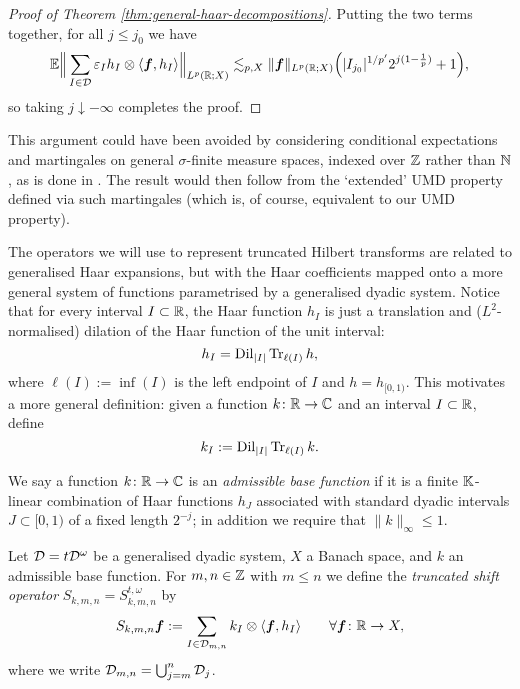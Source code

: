 \begin{proof}[Proof of Theorem \ref{thm:general-haar-decompositions}]
  Putting the two terms together, for all $j \leq j_{0}$ we have
  \begin{equation*}
    \mathbb{E} \Big\| \sum_{I \in \mathcal{D}} \varepsilon_{I} h_{I} \otimes \langle \bm{f}, h_{I} \rangle \Big\|_{L^p(\mathbb{R};X)}
    \lesssim_{p,X}  \|\bm{f}\|_{L^p(\mathbb{R};X)} \Big(|I_{j_{0}}|^{1/p'}  2^{j(1 - \frac{1}{p})} + 1\Big),
  \end{equation*}
  so taking $j \downarrow -\infty$ completes the proof.
\end{proof}

\begin{rmk}
  This argument could have been avoided by considering conditional expectations and martingales on general $\sigma$-finite measure spaces, indexed over $\mathbb{Z}$ rather than $\mathbb{N}$, as is done in \cite{HNVW16}.
  The result would then follow from the `extended' UMD property defined via such martingales (which is, of course, equivalent to our UMD property).
\end{rmk}

The operators we will use to represent truncated Hilbert transforms are related to generalised Haar expansions, but with the Haar coefficients mapped onto a more general system of functions parametrised by a generalised dyadic system.
Notice that for every interval $I \subset \mathbb{R}$, the Haar function $h_{I}$ is just a translation and ($L^2$-normalised) dilation of the Haar function of the unit interval:
\begin{equation*}
  h_{I} = \operatorname{Dil}_{|I|} \operatorname{Tr}_{\ell(I)} h,
\end{equation*}
where $\ell(I) := \inf(I)$ is the left endpoint of $I$ and $h = h_{[0,1)}$.
This motivates a more general definition: given a function $k \colon \mathbb{R} \rightarrow \mathbb{C}$ and an interval $I \subset \mathbb{R}$, define
\begin{equation*}
  k_{I} := \operatorname{Dil}_{|I|} \operatorname{Tr}_{\ell(I)} k.
\end{equation*}

\begin{defn}
  We say a function $k \colon \mathbb{R} \rightarrow \mathbb{C}$ is an \emph{admissible base function} if it is a finite $\mathbb{K}$-linear combination of Haar functions $h_{J}$ associated with standard dyadic intervals $J \subset [0,1)$ of a fixed length $2^{-j}$; in addition we require that $\|k\|_{\infty} \leq 1$.
\end{defn}

\begin{defn}
  Let $\mathcal{D} = t\mathcal{D}^{\omega}$ be a generalised dyadic system, $X$ a Banach space, and $k$ an admissible base function.
  For $m,n \in \mathbb{Z}$ with $m \leq n$ we define the \emph{truncated shift operator} $S_{k,m,n} = S_{k,m,n}^{t,\omega}$ by
  \begin{equation*}
    S_{k,m,n} \bm{f} := \sum_{I \in \mathcal{D}_{m,n}} k_{I} \otimes \langle \bm{f}, h_{I} \rangle \qquad \forall \bm{f} \colon \mathbb{R} \rightarrow X,
  \end{equation*}
  where we write $\mathcal{D}_{m,n} = \bigcup_{j = m}^{n} \mathcal{D}_{j}$.
\end{defn}

